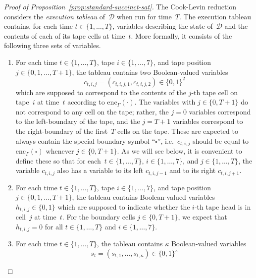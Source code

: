 \documentclass[11pt]{article}
\theoremstyle{definition}
\newcommand{\decider}{\mathcal{D}}
\begin{document}
\begin{proof}[Proof of Proposition~\ref{prop:standard-succinct-sat}]
  The Cook-Levin reduction considers the \emph{execution tableau} of~$\decider$
  when run for time~$T$.
  The execution tableau contains, for each time $t \in \{1, \ldots, T\}$,
  variables describing the state of~$\decider$ and the contents of each of its
  tape cells at time~$t$.
  More formally, it consists of the following three sets of variables.
  \begin{enumerate}
  \item \label{item:cell-variables} For each time $t \in \{1, \ldots, T\}$, tape
    $i \in \{1, \ldots, 7\}$, and tape position $j \in \{0, 1,\ldots, T+1\}$,
    the tableau contains two Boolean-valued variables
    \begin{equation*}
      c_{t, i, j} = (c_{t, i, j, 1}, c_{t, i, j, 2}) \in \{0, 1\}^2
    \end{equation*}
    which are supposed to correspond to the contents of the $j$-th tape cell on
    tape~$i$ at time~$t$ according to $\mathrm{enc}_{\Gamma}(\cdot)$.
    The variables with $j \in \{0, T+1\}$ do not correspond to any cell on the
    tape; rather, the $j=0$ variables correspond to the left-boundary of the
    tape, and the $j=T+1$ variables correspond to the right-boundary of the
    first~$T$ cells on the tape.
    These are expected to always contain the special boundary symbol
    ``$\square$'', i.e.\ $c_{t, i, j}$ should be equal to
    $\mathrm{enc}_{\Gamma}(\square)$ whenever $j \in \{0, T+1\}$.
    As we will see below, it is convenient to define these so that for each~$t
    \in \{1, \ldots, T\}$, $i\in \{1, \ldots, 7\}$, and $j \in \{1, \ldots,
    T\}$, the variable $c_{t, i, j}$ also has a variable to its left $c_{t, i,
      j-1}$ and to its right $c_{t, i, j+1}$.
  \item \label{item:head-variables} For each time $t \in \{1, \ldots, T\}$, tape
    $i \in \{1, \ldots, 7\}$, and tape position $j \in \{0, 1,\ldots, T+1\}$,
    the tableau contains Boolean-valued variables $h_{t, i, j} \in \{0, 1\}$
    which are supposed to indicate whether the $i$-th tape head is in cell~$j$
    at time~$t$.
    For the boundary cells $j \in \{0, T+1\}$, we expect that $h_{t, i, j} = 0$
    for all $t \in \{1, \ldots, T\}$ and $i \in \{1, \ldots, 7\}$.
  \item For each time $t\in \{1, \ldots, T\}$, the tableau contains $\kappa$
    Boolean-valued variables
    \begin{equation*}
      s_t = (s_{t, 1}, \ldots, s_{t, \kappa}) \in \{0, 1\}^\kappa

\end{equation*}
\end{enumerate}
\end{proof}
\end{document}
